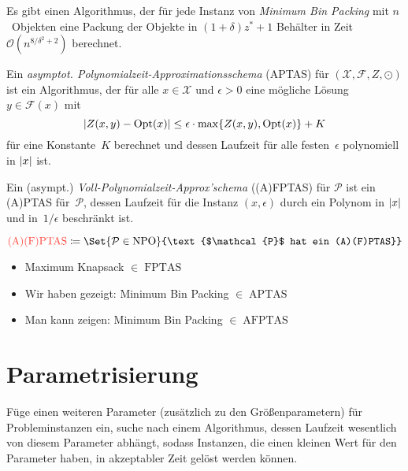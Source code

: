 \documentclass{cheat-sheet}
\newcommand{\Instances}{\mathcal{X}} %
\newcommand{\Feasible}{\mathcal{F}} %
\newcommand{\ObjFun}{Z} %
\newcommand{\Goal}{\odot} %
\newcommand{\OptTuple}{(\Instances{}, \Feasible{}, \ObjFun{}, \Goal)} %
\DeclareMathOperator{\Opt}{Opt} %
\newcommand{\size}[1]{\abs{#1}} %
\DeclareMathOperator{\NPO}{NPO} %
\DeclareMathOperator{\APTAS}{APTAS} %
\DeclareMathOperator{\FPTAS}{FPTAS} %
\DeclareMathOperator{\AFPTAS}{AFPTAS} %
\newcommand{\Prob}{\mathcal{P}} %
\renewcommand{\O}{\mathcal{O}} %
\newcommand{\Defn}[1]{\textcolor{DefinitionColor}{#1}}
\begin{document}
\begin{satz}
  Es gibt einen Algorithmus, der für jede Instanz von \textit{Minimum Bin Packing} mit $n$~Objekten eine Packung der Objekte in $(1 + \delta) z^* + 1$ Behälter in Zeit $\O(n^{8/\delta^2 + 2})$ berechnet.
\end{satz}

\begin{defn}
  Ein \emph{asymptot. Polynomialzeit-Approximationsschema} (APTAS) für $\OptTuple{}$ ist ein Algorithmus, der für alle $x \in \Instances{}$ und $\epsilon > 0$ eine mögliche Lösung $y \in \Feasible(x)$ mit
  \[ \abs{Z(x, y) - \Opt(x)} \leq \epsilon \cdot \max \{ Z(x,y), \Opt(x) \} + K \]
  für eine Konstante~$K$ berechnet und dessen Laufzeit für alle festen~$\epsilon$ polynomiell in $\size{x}$ ist.
\end{defn}

\begin{defn}
  Ein (asympt.) \emph{Voll-Polynomialzeit-Approx'schema} ((A)FPTAS) für $\Prob{}$ ist ein (A)PTAS für~$\Prob{}$, dessen Laufzeit für die Instanz $(x, \epsilon)$ durch ein Polynom in $\size{x}$ und in~$1/\epsilon$ beschränkt ist.
\end{defn}

\begin{defn}
  $\Defn{\mathrm{(A)(F)PTAS}} \coloneqq \Set{\Prob \in \NPO}{\text{$\Prob$ hat ein (A)(F)PTAS}}$
\end{defn}

\begin{bspe}
  \begin{itemize}
    \item Maximum Knapsack $\in \FPTAS$
    \item Wir haben gezeigt: Minimum Bin Packing $\in \APTAS$
    \item Man kann zeigen: Minimum Bin Packing $\in \AFPTAS$
  \end{itemize}
\end{bspe}

\section{Parametrisierung}

\begin{vorgehen}
  Füge einen weiteren Parameter (zusätzlich zu den Größenparametern) für Probleminstanzen ein, suche nach einem Algorithmus, dessen Laufzeit wesentlich von diesem Parameter abhängt, sodass Instanzen, die einen kleinen Wert für den Parameter haben, in akzeptabler Zeit gelöst werden können.
\end{vorgehen}
\end{document}
